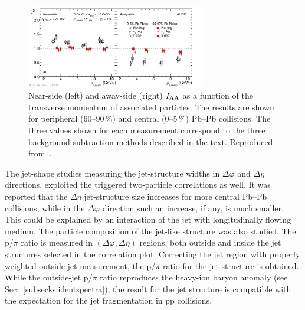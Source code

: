 \begin{figure}
\centering
\includegraphics[width=0.7\textwidth]{ksfigures/IAA.pdf}
\caption{Near-side (left) and away-side (right) $I_{\rm AA}$ as a function of the transverse momentum of associated particles. The results are shown for peripheral (60--90\,\%) and central (0--5\,\%) Pb--Pb collisions. The three values shown for each measurement correspond to the three background subtraction methods described in the text. Reproduced from~\cite{}.}
\label{figks:IAA}
\end{figure}

The jet-shape studies measuring the jet-structure widths in $\Delta\varphi$ and $\Delta\eta$ directions, exploited the triggered two-particle correlations as well. It was reported that the $\Delta\eta$ jet-structure size increases for more central Pb--Pb collisions, while in the $\Delta\varphi$ direction such an increase, if any, is much smaller. This could be explained by an interaction of the jet with longitudinally flowing medium. The particle composition of the jet-like structure was also studied. The p/$\pi$ ratio is measured in $(\Delta\varphi, \Delta\eta)$ regions, both outside and inside the jet structures selected in the correlation plot. Correcting the jet region with properly weighted outside-jet measurement, the p/$\pi$ ratio for the jet structure is obtained. While the outside-jet p/$\pi$ ratio reproduces the heavy-ion baryon anomaly (see Sec.~\ref{subsecks:identspectra}), the result for the jet structure is compatible with the expectation for the jet fragmentation in pp collisions.

